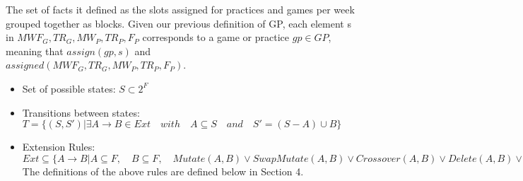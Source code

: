 \documentclass[12 pt]{article}        	%
\begin{document}
The set of facts it defined as the slots assigned for practices and games per week grouped together as blocks. Given our previous definition of GP, each element s in $MWF_G, TR_G, MW_P, TR_P, F_P$ corresponds to a game or practice $gp \in GP$, meaning that $assign(gp, s)$ and \\$assigned(MWF_G, TR_G, MW_P, TR_P, F_P)$.
\begin{itemize}
    \item Set of possible states: $S \subset 2^F$
    \item Transitions between states: $T = \{(S, S')|\exists A \to B \in Ext \quad with \quad A \subseteq S \quad and \quad S' = (S - A) \cup B \}$
    \item Extension Rules: $ Ext \subseteq \{ A \to B | A \subseteq F, \quad B \subseteq F, \quad Mutate(A,B) \lor SwapMutate(A,B) \lor Crossover(A,B) \lor Delete(A,B) \lor Random(A,B) \}$
    \\ The definitions of the above rules are defined below in Section 4. 
\end{itemize}
\end{document}

